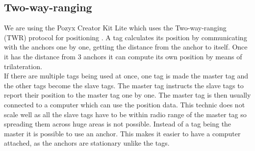 \subsection{Two-way-ranging}
We are using the Pozyx Creator Kit Lite which uses the Two-way-ranging (TWR) protocol for positioning \cite{pozyx-Positioning}.
A tag calculates its position by communicating with the anchors one by one, getting the distance from the anchor to itself.
Once it has the distance from 3 anchors it can compute its own position by means of trilateration.
\\
If there are multiple tags being used at once, one tag is made the master tag and the other tags become the slave tags.
The master tag instructs the slave tags to report their position to the master tag one by one.
The master tag is then usually connected to a computer which can use the position data.
This technic does not scale well as all the slave tags have to be within radio range of the master tag so spreading them across huge areas is not possible.
Instead of a tag being the master it is possible to use an anchor.
This makes it easier to have a computer attached, as the anchors are stationary unlike the tags.

